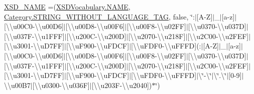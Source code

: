 \begin{DoxyCompactItemize}
\hyperlink{enumorg_1_1semanticweb_1_1owlapi_1_1vocab_1_1_o_w_l2_datatype_afedf82eb26894d331226ab31af126540}{X\-S\-D\-\_\-\-N\-A\-M\-E} =(\hyperlink{enumorg_1_1semanticweb_1_1owlapi_1_1vocab_1_1_x_s_d_vocabulary_a34846eda7ef12a87485e47e445bee899}{X\-S\-D\-Vocabulary.\-N\-A\-M\-E}, \hyperlink{enumorg_1_1semanticweb_1_1owlapi_1_1vocab_1_1_o_w_l2_datatype_1_1_category_a44f9e4681f05aa129189fc174186298a}{Category.\-S\-T\-R\-I\-N\-G\-\_\-\-W\-I\-T\-H\-O\-U\-T\-\_\-\-L\-A\-N\-G\-U\-A\-G\-E\-\_\-\-T\-A\-G}, false, \char`\"{}\-:$|$\mbox{[}A-\/Z\mbox{]}$|$\-\_\-$|$\mbox{[}a-\/z\mbox{]}$|$\mbox{[}\textbackslash{}\textbackslash{}u00\-C0-\/\textbackslash{}\textbackslash{}u00\-D6\mbox{]}$|$\mbox{[}\textbackslash{}\textbackslash{}u00\-D8-\/\textbackslash{}\textbackslash{}u00\-F6\mbox{]}$|$\mbox{[}\textbackslash{}\textbackslash{}u00\-F8-\/\textbackslash{}\textbackslash{}u02\-F\-F\mbox{]}$|$\mbox{[}\textbackslash{}\textbackslash{}u0370-\/\textbackslash{}\textbackslash{}u037\-D\mbox{]}$|$\mbox{[}\textbackslash{}\textbackslash{}u037\-F-\/\textbackslash{}\textbackslash{}u1\-F\-F\-F\mbox{]}$|$\mbox{[}\textbackslash{}\textbackslash{}u200\-C-\/\textbackslash{}\textbackslash{}u200\-D\mbox{]}$|$\mbox{[}\textbackslash{}\textbackslash{}u2070-\/\textbackslash{}\textbackslash{}u218\-F\mbox{]}$|$\mbox{[}\textbackslash{}\textbackslash{}u2\-C00-\/\textbackslash{}\textbackslash{}u2\-F\-E\-F\mbox{]}$|$\mbox{[}\textbackslash{}\textbackslash{}u3001-\/\textbackslash{}\textbackslash{}u\-D7\-F\-F\mbox{]}$|$\mbox{[}\textbackslash{}\textbackslash{}u\-F900-\/\textbackslash{}\textbackslash{}u\-F\-D\-C\-F\mbox{]}$|$\mbox{[}\textbackslash{}\textbackslash{}u\-F\-D\-F0-\/\textbackslash{}\textbackslash{}u\-F\-F\-F\-D\mbox{]}(\-:$|$\mbox{[}A-\/Z\mbox{]}$|$\-\_\-$|$\mbox{[}a-\/z\mbox{]}$|$\mbox{[}\textbackslash{}\textbackslash{}u00\-C0-\/\textbackslash{}\textbackslash{}u00\-D6\mbox{]}$|$\mbox{[}\textbackslash{}\textbackslash{}u00\-D8-\/\textbackslash{}\textbackslash{}u00\-F6\mbox{]}$|$\mbox{[}\textbackslash{}\textbackslash{}u00\-F8-\/\textbackslash{}\textbackslash{}u02\-F\-F\mbox{]}$|$\mbox{[}\textbackslash{}\textbackslash{}u0370-\/\textbackslash{}\textbackslash{}u037\-D\mbox{]}$|$\mbox{[}\textbackslash{}\textbackslash{}u037\-F-\/\textbackslash{}\textbackslash{}u1\-F\-F\-F\mbox{]}$|$\mbox{[}\textbackslash{}\textbackslash{}u200\-C-\/\textbackslash{}\textbackslash{}u200\-D\mbox{]}$|$\mbox{[}\textbackslash{}\textbackslash{}u2070-\/\textbackslash{}\textbackslash{}u218\-F\mbox{]}$|$\mbox{[}\textbackslash{}\textbackslash{}u2\-C00-\/\textbackslash{}\textbackslash{}u2\-F\-E\-F\mbox{]}$|$\mbox{[}\textbackslash{}\textbackslash{}u3001-\/\textbackslash{}\textbackslash{}u\-D7\-F\-F\mbox{]}$|$\mbox{[}\textbackslash{}\textbackslash{}u\-F900-\/\textbackslash{}\textbackslash{}u\-F\-D\-C\-F\mbox{]}$|$\mbox{[}\textbackslash{}\textbackslash{}u\-F\-D\-F0-\/\textbackslash{}\textbackslash{}u\-F\-F\-F\-D\mbox{]}$|$\textbackslash{}\char`\"{}-\/\textbackslash{}\char`\"{}$|$\textbackslash{}\char`\"{}.\textbackslash{}\char`\"{}$|$\mbox{[}0-\/9\mbox{]}$|$\textbackslash{}\textbackslash{}u00\-B7$|$\mbox{[}\textbackslash{}\textbackslash{}u0300-\/\textbackslash{}\textbackslash{}u036\-F\mbox{]}$|$\mbox{[}\textbackslash{}\textbackslash{}u203\-F-\/\textbackslash{}\textbackslash{}u2040\mbox{]})$\ast$\char`\"{})

\end{DoxyCompactItemize}
